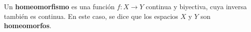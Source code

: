 

\begin{definition}
Un \textbf{homeomorfismo} es una función $f : X \longrightarrow Y$ continua y biyectiva, cuya inversa también es continua. En este caso, se dice que los espacios $X$ y $Y$ son \textbf{homeomorfos}.
\end{definition}
